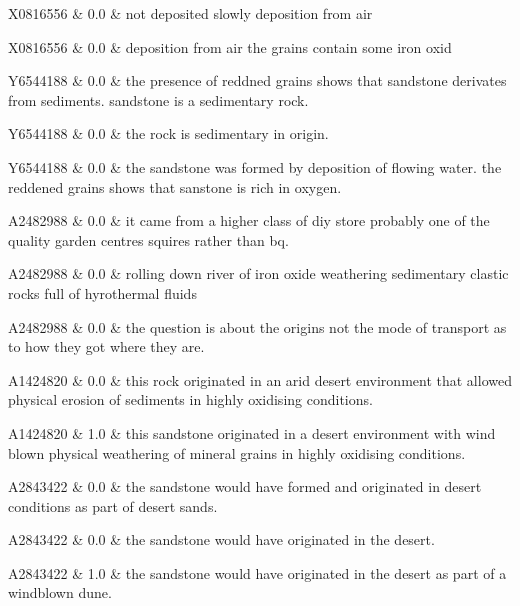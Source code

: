 X0816556 & 0.0 & not deposited slowly deposition from air 
 \\ 

X0816556 & 0.0 & deposition from air the grains contain some iron oxid 
 \\ 

Y6544188 & 0.0 & the presence of reddned grains shows that sandstone derivates from sediments. sandstone is a sedimentary rock. 
 \\ 

Y6544188 & 0.0 & the rock is sedimentary in origin. 
 \\ 

Y6544188 & 0.0 & the sandstone was formed by deposition of flowing water. the reddened grains shows that sanstone is rich in oxygen. 
 \\ 

A2482988 & 0.0 & it came from a higher class of diy store probably one of the quality garden centres squires rather than bq. 
 \\ 

A2482988 & 0.0 & rolling down river of iron oxide weathering sedimentary clastic rocks full of hyrothermal fluids 
 \\ 

A2482988 & 0.0 & the question is about the origins not the mode of transport as to how they got where they are. 
 \\ 

A1424820 & 0.0 & this rock originated in an arid desert environment that allowed physical erosion of sediments in highly oxidising conditions. 
 \\ 

A1424820 & 1.0 & this sandstone originated in a desert environment with wind blown physical weathering of mineral grains in highly oxidising conditions. 
 \\ 

A2843422 & 0.0 & the sandstone would have formed and originated in desert conditions as part of desert sands. 
 \\ 

A2843422 & 0.0 & the sandstone would have originated in the desert. 
 \\ 

A2843422 & 1.0 & the sandstone would have originated in the desert as part of a windblown dune. 
 \\ 

